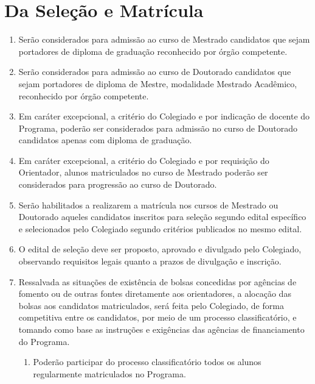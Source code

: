 \documentclass{article}
\begin{document}
\section{Da Seleção e Matrícula}
\begin{enumerate}
	\item Serão considerados para admissão ao curso de Mestrado candidatos que sejam portadores de diploma de graduação reconhecido por órgão competente.
	\item Serão considerados para admissão ao curso de Doutorado candidatos que sejam portadores de diploma de Mestre, modalidade Mestrado Acadêmico, reconhecido por órgão competente.

	\item Em caráter excepcional, a critério do Colegiado e por indicação de docente do Programa, poderão ser considerados para admissão no curso de Doutorado candidatos apenas com diploma de graduação.

	\item Em caráter excepcional, a critério do Colegiado e por requisição do Orientador, alunos matriculados no curso de Mestrado poderão ser considerados para progressão ao curso de Doutorado.

	\item Serão habilitados a realizarem a matrícula nos cursos de Mestrado ou Doutorado aqueles candidatos inscritos para seleção segundo edital específico e selecionados pelo Colegiado segundo critérios publicados no mesmo edital.
	\item O edital de seleção deve ser proposto, aprovado e divulgado pelo Colegiado, observando requisitos legais quanto a prazos de divulgação e inscrição.
	\item Ressalvada as situações de existência de bolsas concedidas por agências de fomento ou de outras fontes diretamente aos orientadores, a alocação das bolsas aos candidatos matriculados, será feita pelo Colegiado, de forma competitiva entre os candidatos, por meio de um processo classificatório, e tomando como base as instruções e exigências das agências de financiamento do Programa.
	\begin{enumerate}
		\item Poderão participar do processo classificatório todos os alunos regularmente matriculados no Programa.
	\end{enumerate}
	

\end{enumerate}
\end{document}
